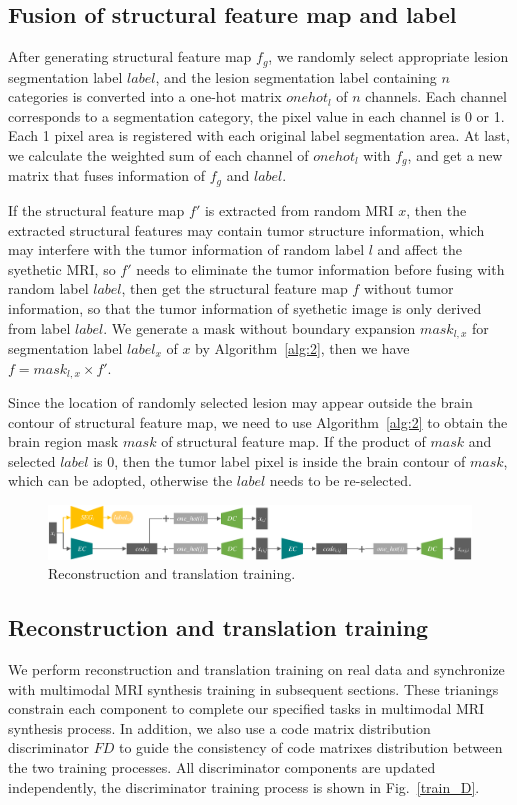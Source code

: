\documentclass{ecai}
\begin{document}
\subsection{Fusion of structural feature map and label}

After generating structural feature map $f_g$, we randomly select appropriate lesion segmentation label $label$, and the lesion segmentation label containing $n$ categories is converted into a one-hot matrix $onehot_l$ of $n$ channels. Each channel corresponds to a segmentation category, the pixel value in each channel is 0 or 1. Each 1 pixel area is registered with each original label segmentation area. At last, we calculate the weighted sum of each channel of $onehot_l$ with $f_g$, and get a new matrix that fuses information of $f_g$ and $label$.

If the structural feature map $f'$ is extracted from random MRI $x$, then the extracted structural features may contain tumor structure information, which may interfere with the tumor information of random label $l$ and affect the syethetic MRI, so $f'$ needs to eliminate the tumor information before fusing with random label $label$, then get the structural feature map $f$ without tumor information, so that the tumor information of syethetic image is only derived from label $label$. We generate a mask without boundary expansion $mask_{l,x}$ for segmentation label $label_x$ of $x$ by Algorithm~\ref{alg:2}, then we have $f=mask_{l,x}\times f'$.

Since the location of randomly selected lesion may appear outside the brain contour of structural feature map, we need to use Algorithm~\ref{alg:2} to obtain the brain region mask $mask$ of structural feature map. If the product of $mask$ and selected $label$ is 0, then the tumor label pixel is inside the brain contour of $mask$, which can be adopted, otherwise the $label$ needs to be re-selected.
\begin{figure}
	\centering
	\includegraphics[width=1.95\columnwidth]{figures/trans_train}
	\caption{Reconstruction and translation training.}
	\label{trans_train}
\end{figure}
\iffalse
\subsection{Reconstruction and translation training}
We perform reconstruction and translation training on real data and synchronize with multimodal MRI synthesis training in subsequent sections. These trianings constrain each component to complete our specified tasks in multimodal MRI synthesis process. In addition, we also use a code matrix distribution discriminator $FD$ to guide the consistency of code matrixes distribution between the two training processes. All discriminator components are updated independently, the discriminator training process is shown in Fig.~\ref{train_D}.
\end{document}
